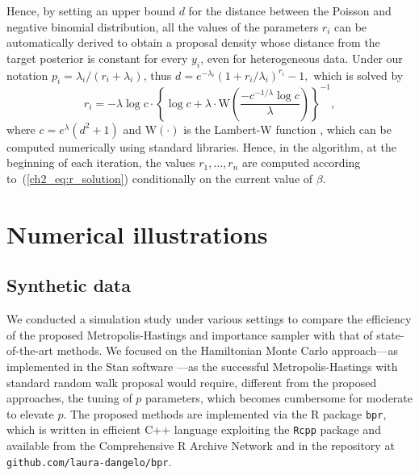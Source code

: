 Hence, by setting an upper bound $d$ for the distance between the Poisson and negative binomial distribution, all the values of the parameters $r_i$ can be automatically derived to obtain a proposal density whose distance from the target posterior is constant for every $y_i$, even for heterogeneous data. Under our notation $p_i=\lambda_i/(r_i+\lambda_i)$, thus
$d = e^{-\lambda_i} ( 1 + r_i/\lambda_i)^{r_i} - 1,$
which is solved by
\begin{equation}
r_i = - \lambda \log c \cdot
\left\{ \log c + \lambda \cdot\mathrm{W}\left( \frac{-c^{-1/\lambda} \log c}{\lambda} \right) \right\}^{-1},
\label{ch2_eq:r_solution}
\end{equation}
where $c=e^{\lambda}(d^2+1)$ and $\mathrm{W}(\cdot)$ is the Lambert-W function \citep{W}, which can be computed numerically using standard libraries. 
%
Hence, in the algorithm, at the beginning of each iteration, the values $r_1, \dots, r_n$ are computed according to~(\ref{ch2_eq:r_solution}) conditionally on the current value of $\beta$. %


\section{Numerical illustrations}
\label{ch2_sec:illustr}

\subsection{Synthetic data}
\label{ch2_sec:sim}

We conducted a simulation study under various settings to compare the efficiency of the proposed Metropolis-Hastings and importance sampler with that of state-of-the-art methods. We focused on the Hamiltonian Monte Carlo approach---as implemented in the Stan software \citep{stan}---as the successful Metropolis-Hastings with standard random walk proposal would require, different from the proposed approaches, the tuning of $p$ parameters, which becomes cumbersome for moderate to elevate $p$. The proposed methods are implemented via the R package \texttt{bpr}, %
which is written in efficient C++ language exploiting the \texttt{Rcpp} package \citep{RCPP} and available from the Comprehensive R Archive Network \citep{bpr} and in the repository
at \texttt{github.com/laura-dangelo/bpr}.

